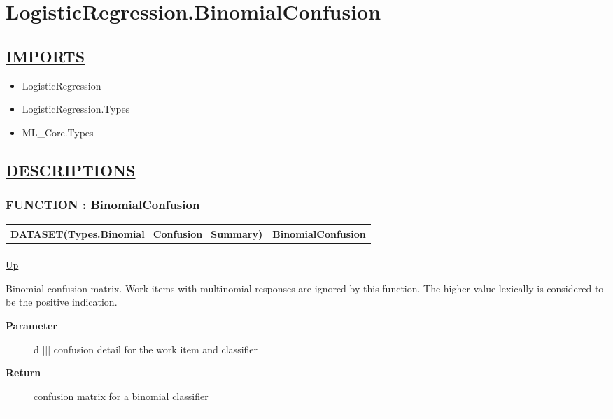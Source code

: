 \chapter*{LogisticRegression.BinomialConfusion}
\hypertarget{ecldoc:toc:LogisticRegression.BinomialConfusion}{}

\section*{\underline{IMPORTS}}
\begin{itemize}
\item LogisticRegression
\item LogisticRegression.Types
\item ML\_Core.Types
\end{itemize}

\section*{\underline{DESCRIPTIONS}}
\subsection*{FUNCTION : BinomialConfusion}
\hypertarget{ecldoc:logisticregression.binomialconfusion}{}

{\renewcommand{\arraystretch}{1.5}
\begin{tabularx}{\textwidth}{|>{\raggedright\arraybackslash}l|X|}
\hline
\hspace{0pt}DATASET(Types.Binomial\_Confusion\_Summary) & BinomialConfusion \\
\hline
\multicolumn{2}{|>{\raggedright\arraybackslash}X|}{\hspace{0pt}(DATASET(Core\_Types.Confusion\_Detail) d)} \\
\hline
\end{tabularx}
}

\hyperlink{ecldoc:toc:LogisticRegression}{Up}

\par
Binomial confusion matrix. Work items with multinomial responses are ignored by this function. The higher value lexically is considered to be the positive indication.

\par
\begin{description}
\item [\textbf{Parameter}] d ||| confusion detail for the work item and classifier
\item [\textbf{Return}] confusion matrix for a binomial classifier
\end{description}

\rule{\textwidth}{0.4pt}
